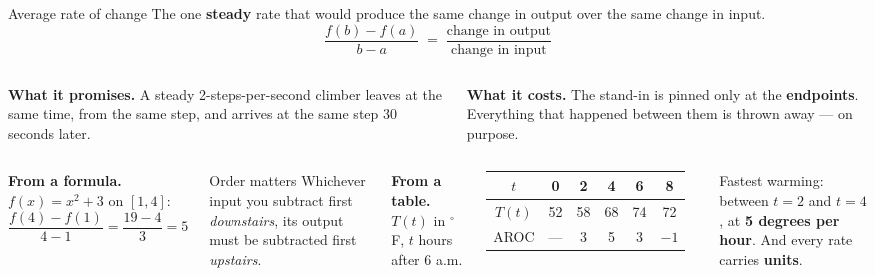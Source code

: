 \documentclass[aspectratio=169, 11pt]{beamer}
\begin{document}
\begin{frame}[t, plain]

  \begin{block}{Average rate of change}
    The one \textbf{steady} rate that would produce the same change in output
    over the same change in input.
    \[
      \frac{f(b) - f(a)}{b - a}
      \;=\; \frac{\text{change in output}}{\text{change in input}}
    \]
  \end{block}

  \medskip
  \begin{columns}[T]
      \textbf{What it promises.} A steady 2-steps-per-second climber leaves at
      the same time, from the same step, and arrives at the same step 30
      seconds later.

      \textbf{What it costs.} The stand-in is pinned only at the
      \textbf{endpoints}. Everything that happened between them is thrown
      away --- on purpose.
  \end{columns}
\end{frame}

\begin{frame}[t, plain]

  \begin{columns}[T]
      \textbf{From a formula.} \(f(x) = x^2 + 3\) on \([1,4]\):
      \[
        \frac{f(4) - f(1)}{4 - 1} = \frac{19 - 4}{3} = 5
      \]

      \medskip
      \begin{block}{Order matters}
        Whichever input you subtract first \textit{downstairs}, its output
        must be subtracted first \textit{upstairs}.
      \end{block}

      \textbf{From a table.} \(T(t)\) in \(^\circ\)F, \(t\) hours after 6 a.m.

      \smallskip
      \begin{tabular}{|c|c|c|c|c|c|}
      \hline
      \(t\) & 0 & 2 & 4 & 6 & 8 \\
      \hline
      \(T(t)\) & 52 & 58 & 68 & 74 & 72 \\
      \hline
      AROC & --- & 3 & 5 & 3 & \(-1\) \\
      \hline
      \end{tabular}

      \medskip
      Fastest warming: between \(t = 2\) and \(t = 4\), at \textbf{5 degrees
      per hour}. And every rate carries \textbf{units}.
  \end{columns}
\end{frame}
\end{document}
